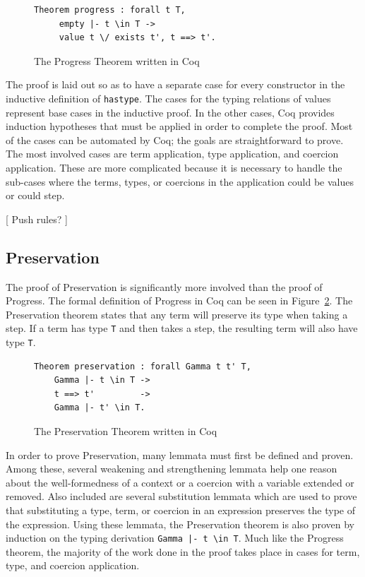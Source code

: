 \documentclass{sig-alternate}
\begin{document}
\begin{figure}[h!]
\begin{lstlisting}
Theorem progress : forall t T, 
     empty |- t \in T ->
     value t \/ exists t', t ==> t'.
\end{lstlisting}
\caption{The Progress Theorem written in Coq}
\label{fig:progress-coq}
\end{figure}

The proof is laid out so as to have a separate case for every constructor in the inductive definition of \texttt{has\textunderscore type}. The cases for the typing relations of values represent base cases in the inductive proof. In the other cases, Coq provides induction hypotheses that must be applied in order to complete the proof. Most of the cases can be automated by Coq; the goals are straightforward to prove. The most involved cases are term application, type application, and coercion application. These are more complicated because it is necessary to handle the sub-cases where the terms, types, or coercions in the application could be values or could step.

[ Push rules? ]

\subsection{Preservation}
\label{sec:implementation-preservation}

The proof of Preservation is significantly more involved than the proof of Progress. The formal definition of Progress in Coq can be seen in Figure~\ref{fig:preservation-coq}. The Preservation theorem states that any term will preserve its type when taking a step. If a term has type \texttt{T} and then takes a step, the resulting term will also have type \texttt{T}. 

\begin{figure}[h!]
\begin{lstlisting}
Theorem preservation : forall Gamma t t' T, 
    Gamma |- t \in T ->
    t ==> t'         ->
    Gamma |- t' \in T.
\end{lstlisting}
\caption{The Preservation Theorem written in Coq}
\label{fig:preservation-coq}
\end{figure}

In order to prove Preservation, many lemmata must first be defined and proven. Among these, several weakening and strengthening lemmata help one reason about the well-formedness of a context or a coercion with a variable extended or removed. Also included are several substitution lemmata which are used to prove that substituting a type, term, or coercion in an expression preserves the type of the expression. Using these lemmata, the Preservation theorem is also proven by induction on the typing derivation \texttt{Gamma |- t \textbackslash in T}. Much like the Progress theorem, the majority of the work done in the proof takes place in cases for term, type, and coercion application.
\end{document}
